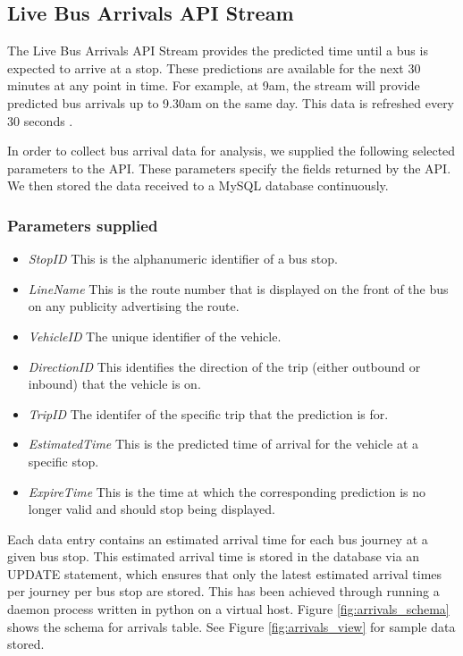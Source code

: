 
\subsection{Live Bus Arrivals API Stream}
\par The Live Bus Arrivals API Stream provides the predicted time until a bus is expected to arrive at a stop. These predictions are available for the next 30 minutes at any point in time. For example, at 9am, the stream will provide predicted bus arrivals up to 9.30am on the same day. This data is refreshed every 30 seconds \cite{live_bus_api_documentation}.

\par In order to collect bus arrival data for analysis, we supplied the following selected parameters to the API. These parameters specify the fields returned by the API. We then stored the data received to a MySQL database continuously. 

\subsubsection{Parameters supplied} 
\begin{itemize}
	\item \textit{StopID} This is the alphanumeric identifier of a bus stop.
   	\item \textit{LineName} This is the route number that is displayed on the front of the bus on any publicity advertising the route.
	\item \textit{VehicleID} The unique identifier of the vehicle.
    \item \textit{DirectionID} This identifies the direction of the trip (either outbound or inbound) that the vehicle is on.
    \item \textit{TripID} The identifer of the specific trip that the prediction is for.
    \item \textit{EstimatedTime} This is the predicted time of arrival for the vehicle at a specific stop.
    \item \textit{ExpireTime} This is the time at which the corresponding prediction is no longer valid and should stop being displayed.
\end{itemize}

\par Each data entry contains an estimated arrival time for each bus journey at a given bus stop. This estimated arrival time is stored in the database via an UPDATE statement, which ensures that only the latest estimated arrival times per journey per bus stop are stored. This has been achieved through running a daemon process written in python on a virtual host. Figure \ref{fig:arrivals_schema} shows the schema for arrivals table. See Figure \ref{fig:arrivals_view} for sample data stored. 


